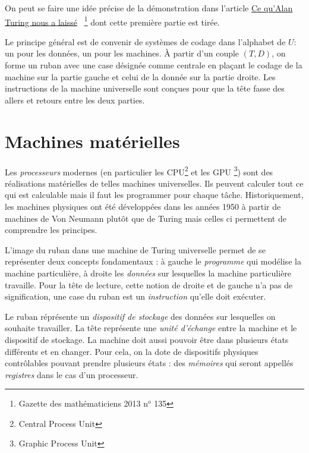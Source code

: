 On peut se faire une idée précise de la démonstration dans l'article \og\href{http://smf4.emath.fr/Publications/Gazette/2013/135/smf_gazette_135_17-31.pdf}{Ce qu'Alan Turing nous a laissé}\fg~ \footnote{Gazette des mathématiciens 2013 n$^o$ 135} dont cette première partie est tirée.

Le principe général est de convenir de systèmes de codage dans l'alphabet de $U$: un pour les données, un pour les machines. \`A partir d'un couple $(T,D)$, on forme un ruban avec une case désignée comme centrale en plaçant le codage de la machine sur la partie gauche et celui de la donnée sur la partie droite. Les instructions de la machine universelle sont conçues pour que la tête fasse des allers et retours entre les deux parties.

\section{Machines matérielles}
Les \emph{processeurs} modernes (en particulier les CPU\footnote{Central Process Unit} et les GPU \footnote{Graphic Process Unit}) sont des réalisations matérielles de telles machines universelles. Ils peuvent calculer tout ce qui est calculable mais il faut les programmer pour chaque tâche. Historiquement, les machines physiques ont été développées dans les années 1950 à partir de machines de Von Neumann plutôt que de Turing mais celles ci permettent de comprendre les principes.

L'image du ruban dans une machine de Turing universelle permet de se représenter deux concepts fondamentaux : à gauche le \emph{programme} qui modélise la machine particulière, à droite les \emph{données} sur lesquelles la machine particulière travaille. Pour la tête de lecture, cette notion de droite et de gauche n'a pas de signification, une case du ruban est un \emph{instruction} qu'elle doit exécuter.

Le ruban réprésente un \emph{dispositif de stockage} des données sur lesquelles on souhaite travailler. La tête représente une \emph{unité d'échange} entre la machine et le dispositif de stockage. La machine doit aussi pouvoir être dans plusieurs états différents et en changer. Pour cela, on la dote de dispositifs physiques contrôlables pouvant prendre plusieurs états : des \emph{mémoires} qui seront appellés \emph{registres} dans le cas d'un processeur.


